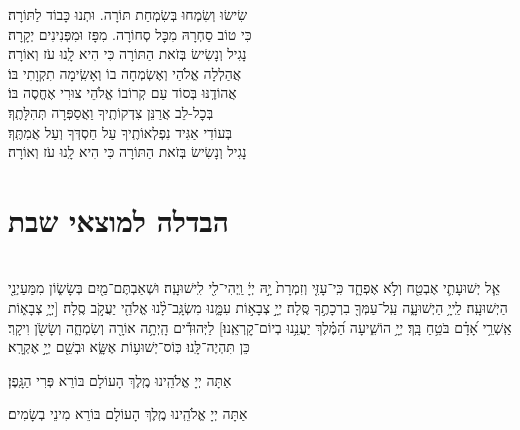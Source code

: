 \documentclass[twoside, openany, parskip=half, 11pt]{book}
\begin{document}
שִׂישׂוּ וְשִׂמְחוּ בְּשִׂמְחַת תּוֹרָה. \hfill וּתְנוּ כָּבוֹד לַתּוֹרָה׃\\
כִּי טוֹב סַחְרָהּ מִכׇּל סְחוֹרָה. \hfill מִפָּז וּמִפְּנִינִים יְקָרָה׃\\
נָגִיל וְנָשִׂישׂ בְּזֹאת הַתּוֹרָה \hfill כִּי הִיא לָֽנוּ עֹז וְאוֹרָה׃\\
אֲהַלְלָה אֱלֹהַי וְאֶשְׂמְחָה בוֹ \hfill וְאָשִֽׂימָה תִקְוָתִי בּוֹ׃\\
אֲהוֹדֶֽנּוּ בְּסוֹד עַם קְרוֹבוֹ \hfill אֱלֹהֵי צוּרִי אֶחֱסֶה בּוֹ׃\\
בְּכׇל-לֵב אֲרַנֵּן צִדְקוֹתֶֽיךָ \hfill וַאֲסַפְּרָה תְּהִלָּתֶֽךָ׃\\
בְּעוֹדִי אַגִּיד נִפְלְאוֹתֶֽיךָ \hfill עַל חַסְדְּךָ וְעַל אֲמִתֶּֽךָ׃\\
נָגִיל וְנָשִׂישׂ בְּזֹאת הַתּוֹרָה \hfill כִּי הִיא לָֽנוּ עֹז וְאוֹרָה׃

\vfill
{}


\sepline



%
\blankpage

\let\clearpage\relax{


}
%


\section[הבדלה]{ הבדלה למוצאי שבת } \label{havdala}

\\
אֵ֧ל יְשׁוּעָתִ֛י אֶבְטַ֖ח וְלֹ֣א אֶפְחָ֑ד כִּֽי־עָזִּ֤י וְזִמְרָת֙ יָ֣הּ יְיָ֔ וַֽיְהִי־לִ֖י לִֽישׁוּעָֽה׃
וּשְׁאַבְתֶּם־מַ֖יִם בְּשָׂשׂ֑וֹן מִמַּעַיְנֵ֖י הַיְשׁוּעָֽה׃
לַֽייָ֥ הַיְשׁוּעָ֑ה עַֽל־עַמְּךָ֖ בִרְכָתֶ֣ךָ סֶּֽלָה׃
יְיָ֣ צְבָא֣וֹת עִמָּ֑נוּ מִשְׂגָּֽב־לָ֨נוּ אֱלֹהֵ֖י יַעֲקֹ֣ב סֶֽלָה׃
[יְיָ֥ צְבָא֑וֹת אַֽשְׁרֵ֥י אָ֝דָ֗ם בֹּטֵ֥חַ בָּֽךְ׃
יְיָ֥ הוֹשִׁ֑יעָה הַ֝מֶּ֗לֶךְ יַעֲנֵ֥נוּ בְיוֹם־קׇרְאֵֽנוּ׃]
לַיְּהוּדִ֕ים הָֽיְתָ֥ה אוֹרָ֖ה וְשִׂמְחָ֑ה וְשָׂשֹׂ֖ן וִיקָֽר׃ כֵּן תִּהְיֶה־לָּֽנוּ׃ כּֽוֹס־יְשׁוּע֥וֹת אֶשָּׂ֑א וּבְשֵׁ֖ם יְיָ֣ אֶקְרָֽא׃

\savri
{}
אַתָּה יְיָ אֱלֹהֵֽינוּ מֶֽלֶךְ הָעוֹלָם בּוֹרֵא פְּרִי הַגָּֽפֶן׃

אַתָּה יְיָ אֱלֹהֵֽינוּ מֶֽלֶךְ הָעוֹלָם בּוֹרֵא מִינֵי בְשָׂמִים׃
\end{document}
